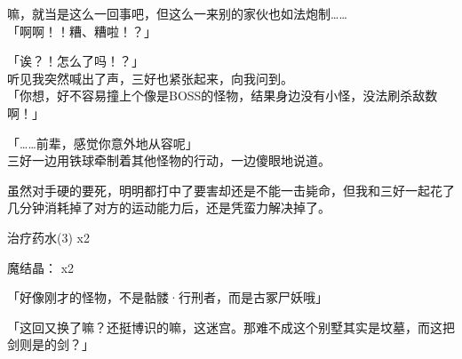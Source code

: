 嘛，就当是这么一回事吧，但这么一来别的家伙也如法炮制……\\

「啊啊！！糟、糟啦！？」

「诶？！怎么了吗！？」\\

听见我突然喊出了声，三好也紧张起来，向我问到。\\

「你想，好不容易撞上个像是BOSS的怪物，结果身边没有小怪，没法刷杀敌数啊！」

「……前辈，感觉你意外地从容呢」\\

三好一边用铁球牵制着其他怪物的行动，一边傻眼地说道。

虽然对手硬的要死，明明都打中了要害却还是不能一击毙命，但我和三好一起花了几分钟消耗掉了对方的运动能力后，还是凭蛮力解决掉了。\\

\cardline

  治疗药水(3) x2

  魔结晶： x2


\cardline

「好像刚才的怪物，不是骷髅·行刑者，而是古冢尸妖哦」

「这回又换了嘛？还挺博识的嘛，这迷宫。那难不成这个别墅其实是坟墓，而这把剑则是的剑？」\\

